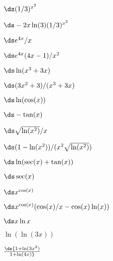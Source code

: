 \begin{exercises}
\begin{exercise}  $\ds (1/3)^{x^2}$
\begin{answer} $\ds -2x\ln(3)(1/3)^{x^2}$
\end{answer}\end{exercise}

\begin{exercise}  $\ds e^{4x}/x$
\begin{answer} $\ds e^{4x}(4x-1)/x^2$
\end{answer}\end{exercise}

\begin{exercise}  $\ds \ln(x^3+3x)$
\begin{answer} $\ds (3x^2+3)/(x^3+3x)$
\end{answer}\end{exercise}

\begin{exercise}  $\ds \ln(\cos(x))$
\begin{answer} $\ds -\tan(x)$
\end{answer}\end{exercise}

\begin{exercise}  $\ds\sqrt{\ln(x^2)}/x$
\begin{answer} $\ds (1-\ln(x^2))/(x^2\sqrt{\ln(x^2)})$
\end{answer}\end{exercise}

\begin{exercise}  $\ds \ln(\sec(x) + \tan(x))$
\begin{answer} $\ds \sec(x)$
\end{answer}\end{exercise}

\begin{exercise}  $\ds x^{\cos(x)}$
\begin{answer} $\ds x^{\cos(x)}(\cos(x)/x-\cos(x)\ln(x))$
\end{answer}\end{exercise}

\begin{exercise} $\ds x\ln x$
\end{exercise}

\begin{exercise} $\ln (\ln (3x) )$
\end{exercise}

\begin{exercise} $\ds {1+\ln (3x^2 )\over 1+ \ln(4x)}$
\end{exercise}


\end{exercises}
